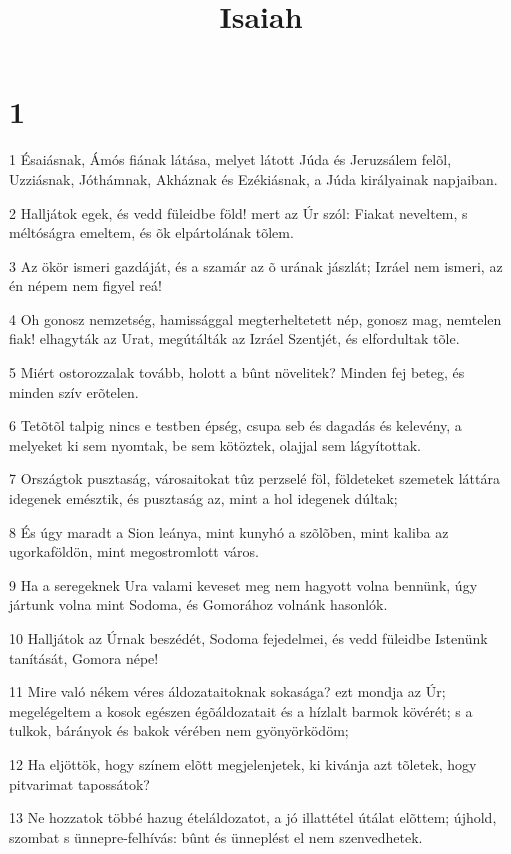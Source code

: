 

\title{Isaiah}


\chapter{1}

\par 1 Ésaiásnak, Ámós fiának látása, melyet látott Júda és Jeruzsálem felõl, Uzziásnak, Jóthámnak, Akháznak és Ezékiásnak, a Júda királyainak napjaiban.
\par 2 Halljátok egek, és vedd füleidbe föld! mert az Úr szól: Fiakat neveltem, s  méltóságra emeltem, és õk elpártolának tõlem.
\par 3 Az ökör ismeri gazdáját, és a szamár az õ urának jászlát; Izráel nem ismeri, az én népem nem figyel reá!
\par 4 Oh gonosz nemzetség, hamissággal megterheltetett nép, gonosz mag, nemtelen fiak! elhagyták  az Urat, megútálták az Izráel Szentjét, és elfordultak tõle.
\par 5 Miért ostorozzalak tovább, holott a bûnt növelitek? Minden fej beteg, és minden szív erõtelen.
\par 6 Tetõtõl talpig nincs e testben épség, csupa seb és dagadás és kelevény, a melyeket ki sem nyomtak, be sem kötöztek, olajjal sem lágyítottak.
\par 7 Országtok pusztaság, városaitokat tûz perzselé föl, földeteket szemetek láttára idegenek emésztik, és pusztaság az, mint a hol idegenek dúltak;
\par 8 És úgy maradt a Sion leánya, mint kunyhó a szõlõben, mint kaliba az ugorkaföldön, mint megostromlott város.
\par 9 Ha a seregeknek Ura valami keveset meg nem hagyott volna bennünk, úgy jártunk volna mint Sodoma, és Gomorához  volnánk hasonlók.
\par 10 Halljátok az Úrnak beszédét, Sodoma fejedelmei, és vedd füleidbe Istenünk tanítását, Gomora népe!
\par 11 Mire való nékem véres áldozataitoknak sokasága? ezt mondja az Úr; megelégeltem a kosok egészen égõáldozatait és a hízlalt barmok kövérét; s a tulkok, bárányok és bakok vérében nem gyönyörködöm;
\par 12 Ha eljöttök, hogy színem elõtt megjelenjetek, ki kivánja azt tõletek, hogy pitvarimat tapossátok?
\par 13 Ne hozzatok többé hazug ételáldozatot, a jó illattétel útálat elõttem; újhold, szombat s ünnepre-felhívás: bûnt és ünneplést el nem szenvedhetek.
